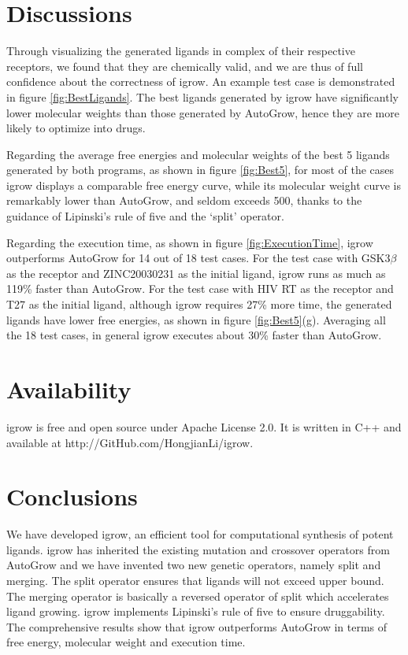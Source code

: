 \documentclass[10pt, conference, compsocconf]{IEEEtran}
\begin{document}
\section{Discussions}

Through visualizing the generated ligands in complex of their respective receptors, we found that they are chemically valid, and we are thus of full confidence about the correctness of igrow. An example test case is demonstrated in figure \ref {fig:BestLigands}.
The best ligands generated by igrow have significantly lower molecular weights than those generated by AutoGrow, hence they are more likely to optimize into drugs.

Regarding the average free energies and molecular weights of the best 5 ligands generated by both programs, as shown in figure \ref{fig:Best5}, for most of the cases igrow displays a comparable free energy curve, while its molecular weight curve is remarkably lower than AutoGrow, and seldom exceeds 500, thanks to the guidance of Lipinski's rule of five and the `split' operator.

Regarding the execution time, as shown in figure \ref{fig:ExecutionTime}, igrow outperforms AutoGrow for 14 out of 18 test cases.
For the test case with GSK3$\beta$ as the receptor and ZINC20030231 as the initial ligand, igrow runs as much as 119\% faster than AutoGrow.
For the test case with HIV RT as the receptor and T27 as the initial ligand, although igrow requires 27\% more time, the generated ligands have lower free energies, as shown in figure \ref{fig:Best5}(g).
Averaging all the 18 test cases, in general igrow executes about 30\% faster than AutoGrow.

\section{Availability}

igrow is free and open source under Apache License 2.0. It is written in C++ and available at http://GitHub.com/HongjianLi/igrow.

\section{Conclusions}

We have developed igrow, an efficient tool for computational synthesis of potent ligands.
igrow has inherited the existing mutation and crossover operators from AutoGrow and we have invented two new genetic operators, namely split and merging.
The split operator ensures that ligands will not exceed upper bound.
The merging operator is basically a reversed operator of split which accelerates ligand growing.
igrow implements Lipinski's rule of five to ensure druggability.
The comprehensive results show that igrow outperforms AutoGrow in terms of free energy, molecular weight and execution time.



\end{document}

